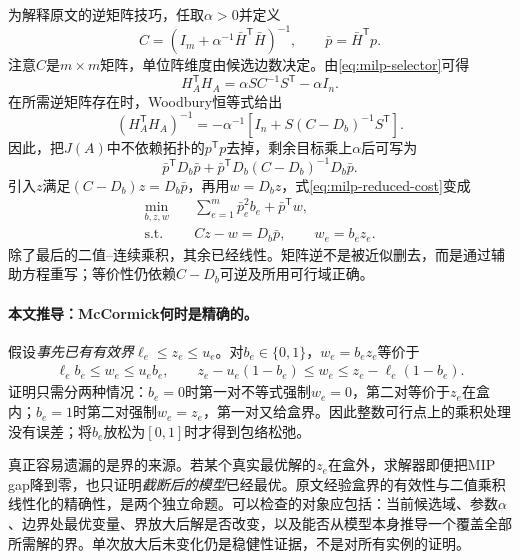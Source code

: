 \documentclass[UTF8,11pt,fontset=fandol]{ctexart}
\theoremstyle{remark}
\numberwithin{equation}{section}
\begin{document}
为解释原文的逆矩阵技巧，任取$\alpha>0$并定义
\begin{equation}
 C=(I_m+\alpha^{-1}\bar H^{\mathsf T}\bar H)^{-1},
 \qquad \bar p=\bar H^{\mathsf T}p.
 \label{eq:milp-C}
\end{equation}
注意$C$是$m\times m$矩阵，单位阵维度由候选边数决定。由\eqref{eq:milp-selector}可得
\begin{equation}
 H_A^{\mathsf T}H_A=\alpha SC^{-1}S^{\mathsf T}-\alpha I_n.
 \label{eq:milp-gram}
\end{equation}
在所需逆矩阵存在时，Woodbury恒等式给出
\begin{equation}
 (H_A^{\mathsf T}H_A)^{-1}
 =-\alpha^{-1}\left[I_n+S(C-D_b)^{-1}S^{\mathsf T}\right].
 \label{eq:milp-woodbury}
\end{equation}
因此，把$J(A)$中不依赖拓扑的$p^{\mathsf T}p$去掉，剩余目标乘上$\alpha$后可写为
\begin{equation}
 \bar p^{\mathsf T}D_b\bar p+
 \bar p^{\mathsf T}D_b(C-D_b)^{-1}D_b\bar p.
 \label{eq:milp-reduced-cost}
\end{equation}
引入$z$满足$(C-D_b)z=D_b\bar p$，再用$w=D_bz$，式\eqref{eq:milp-reduced-cost}变成
\begin{align}
 \min_{b,z,w}\quad &\sum_{e=1}^{m}\bar p_e^2b_e+\bar p^{\mathsf T}w,\label{eq:milp-linear-objective}\\
 \text{s.t.}\quad &Cz-w=D_b\bar p,\qquad w_e=b_ez_e.\nonumber
\end{align}
除了最后的二值--连续乘积，其余已经线性。矩阵逆不是被近似删去，而是通过辅助方程重写；等价性仍依赖$C-D_b$可逆及所用可行域正确。

\paragraph{本文推导：McCormick何时是精确的。}
假设\emph{事先已有有效界}$\ell_e\leq z_e\leq u_e$。对$b_e\in\{0,1\}$，$w_e=b_ez_e$等价于
\begin{align}
 \ell_e b_e\leq w_e\leq u_e b_e,\qquad
 z_e-u_e(1-b_e)\leq w_e\leq z_e-\ell_e(1-b_e).
 \label{eq:milp-mccormick}
\end{align}
证明只需分两种情况：$b_e=0$时第一对不等式强制$w_e=0$，第二对等价于$z_e$在盒内；$b_e=1$时第二对强制$w_e=z_e$，第一对又给盒界。因此整数可行点上的乘积处理没有误差；将$b_e$放松为$[0,1]$时才得到包络松弛。

真正容易遗漏的是界的来源。若某个真实最优解的$z_e$在盒外，求解器即便把MIP gap降到零，也只证明\emph{截断后的模型}已经最优。原文经验盒界的有效性与二值乘积线性化的精确性，是两个独立命题。可以检查的对象应包括：当前候选域、参数$\alpha$、边界处最优变量、界放大后解是否改变，以及能否从模型本身推导一个覆盖全部所需解的界。单次放大后未变化仍是稳健性证据，不是对所有实例的证明。
\end{document}
